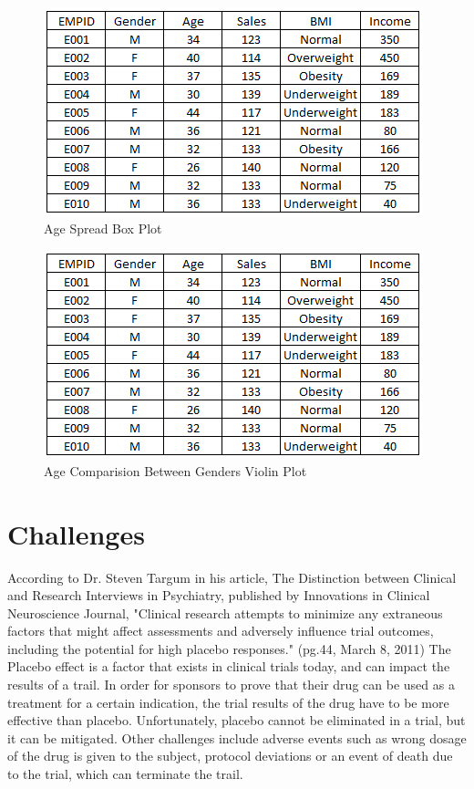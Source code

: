 \documentclass[sigconf]{acmart}
\begin{document}
\begin{figure}[htb]
  \centering
  \includegraphics[width=1.0\columnwidth]{paper2/Table 1.png}
  \caption{Age Spread Box Plot
  \cite{Sunil Ray }}
  \label{fig:Graph 2} 
\end{figure}

\begin{figure}[htb]
  \centering
  \includegraphics[width=1.0\columnwidth]{paper2/Table 1.png}
  \caption{Age Comparision Between Genders Violin Plot
  \cite{Sunil Ray }}
  \label{fig:Graph 3} 
\end{figure}

\section{Challenges}

According to Dr. Steven Targum in his article, The Distinction between Clinical and Research Interviews in Psychiatry, published by Innovations in Clinical Neuroscience Journal, "Clinical research attempts to minimize any extraneous factors that might affect assessments and adversely influence trial outcomes, including the potential for high placebo responses." (pg.44, March 8, 2011) 
The Placebo effect is a factor that exists in clinical trials today, and can impact the results of a trail. 
In order for sponsors to prove that their drug can be used as a treatment for a certain indication, the trial results of the drug have to be more effective than placebo. Unfortunately, placebo cannot be eliminated in a trial, but it can be mitigated. 
Other challenges include adverse events such as wrong dosage of the drug is given to the subject, protocol deviations or an event of death due to the trial, which can terminate the trail. 
\end{document}
